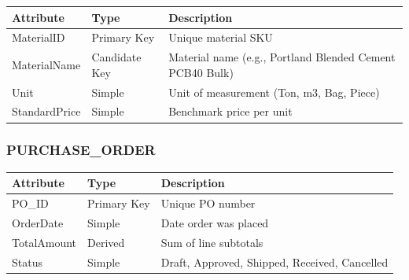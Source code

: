 \documentclass[a4paper,12pt]{report}
\newcounter{none} %
\begin{document}
{\def\LTcaptype{none} %
\begin{longtable}[]{@{}
  >{\raggedright\arraybackslash}p{}
  >{\raggedright\arraybackslash}p{}
  >{\raggedright\arraybackslash}p{}@{}}
\toprule\noalign{}
\begin{minipage}[b]{\linewidth}\raggedright
Attribute
\end{minipage} & \begin{minipage}[b]{\linewidth}\raggedright
Type
\end{minipage} & \begin{minipage}[b]{\linewidth}\raggedright
Description
\end{minipage} \\
\midrule\noalign{}
\endhead
\bottomrule\noalign{}
\endlastfoot
MaterialID & Primary Key & Unique material SKU \\
MaterialName & Candidate Key & Material name (\allowbreak{}e.\allowbreak{}g., Portland Blended Cement PCB40 Bulk) \\
Unit & Simple & Unit of measurement (\allowbreak{}Ton, m3, Bag, Piece) \\
StandardPrice & Simple & Benchmark price per unit \\
\end{longtable}
}

\subsubsection{\texorpdfstring{PURCHASE\texorpdfstring{\_\allowbreak{}}{_}ORDER}{PURCHASEORDER}}\label{purchase_order}

{\def\LTcaptype{none} %
\begin{longtable}[]{@{}
  >{\raggedright\arraybackslash}p{}
  >{\raggedright\arraybackslash}p{}
  >{\raggedright\arraybackslash}p{}@{}}
\toprule\noalign{}
\begin{minipage}[b]{\linewidth}\raggedright
Attribute
\end{minipage} & \begin{minipage}[b]{\linewidth}\raggedright
Type
\end{minipage} & \begin{minipage}[b]{\linewidth}\raggedright
Description
\end{minipage} \\
\midrule\noalign{}
\endhead
\bottomrule\noalign{}
\endlastfoot
PO\_\allowbreak{}ID & Primary Key & Unique PO number \\
OrderDate & Simple & Date order was placed \\
TotalAmount & Derived & Sum of line subtotals \\
Status & Simple & Draft, Approved, Shipped, Received, Cancelled \\
\end{longtable}
}
\end{document}

